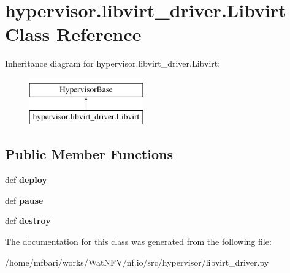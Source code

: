 \hypertarget{classhypervisor_1_1libvirt__driver_1_1Libvirt}{\section{hypervisor.\-libvirt\-\_\-driver.\-Libvirt Class Reference}
\label{classhypervisor_1_1libvirt__driver_1_1Libvirt}
}
Inheritance diagram for hypervisor.\-libvirt\-\_\-driver.\-Libvirt\-:\begin{figure}[H]
\begin{center}
\leavevmode
\includegraphics[height=2.000000cm]{classhypervisor_1_1libvirt__driver_1_1Libvirt}
\end{center}
\end{figure}
\subsection*{Public Member Functions}
\begin{DoxyCompactItemize}
\item 
\hypertarget{classhypervisor_1_1libvirt__driver_1_1Libvirt_ab8f6a87c28e570ecc55693e665b915fa}{def {\bfseries deploy}}\label{classhypervisor_1_1libvirt__driver_1_1Libvirt_ab8f6a87c28e570ecc55693e665b915fa}

\item 
\hypertarget{classhypervisor_1_1libvirt__driver_1_1Libvirt_ae82b6fcef27839a8db06edfb0857ee9e}{def {\bfseries pause}}\label{classhypervisor_1_1libvirt__driver_1_1Libvirt_ae82b6fcef27839a8db06edfb0857ee9e}

\item 
\hypertarget{classhypervisor_1_1libvirt__driver_1_1Libvirt_a48a5b9aa63f54fff5c4bcfd2dbdf104a}{def {\bfseries destroy}}\label{classhypervisor_1_1libvirt__driver_1_1Libvirt_a48a5b9aa63f54fff5c4bcfd2dbdf104a}

\end{DoxyCompactItemize}


The documentation for this class was generated from the following file\-:\begin{DoxyCompactItemize}
\item 
/home/mfbari/works/\-Wat\-N\-F\-V/nf.\-io/src/hypervisor/libvirt\-\_\-driver.\-py\end{DoxyCompactItemize}
